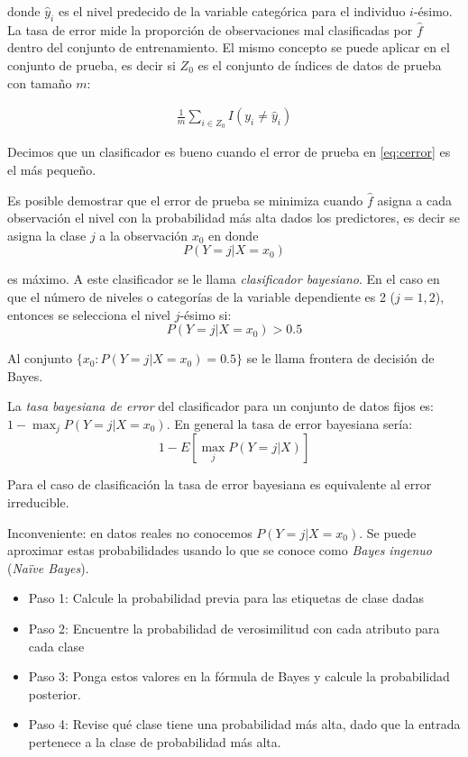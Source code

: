 \documentclass[
  12pt,
]{book}
\providecommand{\tightlist}{%
  \setlength{\itemsep}{0pt}\setlength{\parskip}{0pt}}
\theoremstyle{definition}
\theoremstyle{definition}
\theoremstyle{definition}
\theoremstyle{definition}
\theoremstyle{remark}
\begin{document}
donde \(\hat y_i\) es el nivel predecido de la variable categórica para el individuo \(i\)-ésimo. La tasa de error mide la proporción de observaciones mal clasificadas por \(\hat f\) dentro del conjunto de entrenamiento. El mismo concepto se puede aplicar en el conjunto de prueba, es decir si \(Z_0\) es el conjunto de índices de datos de prueba con tamaño \(m\):

\begin{align}
\frac 1 m \sum_{i \in Z_0}I(y_i\neq \hat y_i)
\label{eq:cerror}
\end{align}

Decimos que un clasificador es bueno cuando el error de prueba en \eqref{eq:cerror} es el más pequeño.

Es posible demostrar que el error de prueba se minimiza cuando \(\hat f\) asigna a cada observación el nivel con la probabilidad más alta dados los predictores, es decir se asigna la clase \(j\) a la observación \(x_0\) en donde
\[P(Y=j|X=x_0)\]

es máximo. A este clasificador se le llama \emph{clasificador bayesiano}. En el caso en que el número de niveles o categorías de la variable dependiente es 2 (\(j=1,2\)), entonces se selecciona el nivel \(j\)-ésimo si:
\[P(Y=j|X=x_0)>0.5\]

Al conjunto \(\{x_0: P(Y=j|X=x_0)=0.5\}\) se le llama frontera de decisión de Bayes.

La \emph{tasa bayesiana de error} del clasificador para un conjunto de datos fijos es:
\(1-\max_j P(Y=j|X=x_0)\). En general la tasa de error bayesiana sería:
\[1-E\left[\max_j P(Y=j|X)\right]\]

Para el caso de clasificación la tasa de error bayesiana es equivalente al error irreducible.

Inconveniente: en datos reales no conocemos \(P(Y=j|X=x_0)\). Se puede aproximar estas probabilidades usando lo que se conoce como \emph{Bayes ingenuo} (\emph{Naïve Bayes}).

\begin{itemize}
\tightlist
\item
  Paso 1: Calcule la probabilidad previa para las etiquetas de clase dadas
\item
  Paso 2: Encuentre la probabilidad de verosimilitud con cada atributo para cada clase
\item
  Paso 3: Ponga estos valores en la fórmula de Bayes y calcule la probabilidad posterior.
\item
  Paso 4: Revise qué clase tiene una probabilidad más alta, dado que la entrada pertenece a la clase de probabilidad más alta.
\end{itemize}
\end{document}
